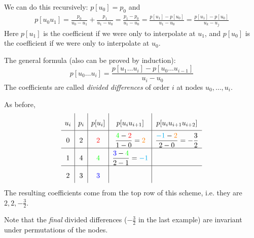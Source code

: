 We can do this recursively:
$p[u_0] = p_0$ and
\begin{align*}
    p[u_0 u_1] = 
    \frac{p_0}{u_0 - u_1} + \frac{p_1}{u_1 - u_0} = \frac{p_1 - p_0}{u_1 - u_0} =
    \frac{p[u_1] - p[u_0]}{u_1 - u_0} = \frac{p[u_1] - p[u_0]}{u_k - u_j}
\end{align*}
Here $p[u_1]$ is the coefficient if we were only to interpolate at $u_1$,
and $p[u_0]$ is the coefficient if we were only to interpolate at $u_0$.

The general formula (also can be proved by induction):
\[
    p[u_0 \dots u_i] = \frac{p[u_1 \dots u_i] - p[u_0 \dots u_{i-1}]}{u_i - u_0}
\]
The coefficients are called \textit{divided differences}
of order $i$ at nodes $u_0, \dots, u_i$.
\begin{example}
    As before, 
    \[
        {
            \renewcommand{\arraystretch}{2}
            \begin{array}{c|c|c|c|c}
                u_i & p_i & p[u_i] & p[u_i u_{i+1}] & p[u_i u_{i+1} u_{i+2}]
                \\\hline
                0 & 2 & \textcolor{red}{2} &
                \dfrac{\textcolor{green}{4} - \textcolor{red}{2}}{1 - 0} = \textcolor{orange}{2} &
                \dfrac{\textcolor{cyan}{-1} - \textcolor{orange}{2}}{2 - 0} = -\dfrac{3}{2}
                \\\hline
                1 & 4 & \textcolor{green}{4} & 
                \dfrac{\textcolor{blue}{3} - \textcolor{green}{4}}{2 - 1} = \textcolor{cyan}{-1}
                \\\hline
                2 & 3 & \textcolor{blue}{3} &
            \end{array} 
        }
    \]
    The resulting coefficients come from the top row of this scheme, i.e.
    they are $2, 2, -\frac{3}{2}$.

    Note that the \textit{final} divided differences ($-\frac{3}{2}$ in the last example)
    are invariant under permutations of the nodes.
\end{example}

